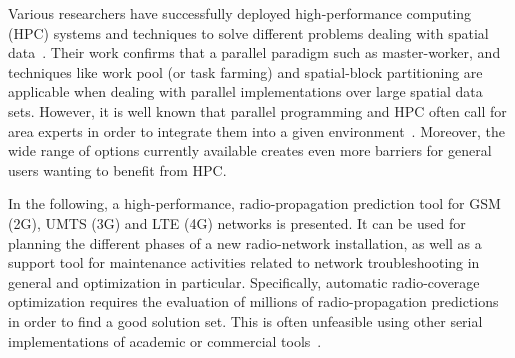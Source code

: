 Various researchers have successfully deployed high-performance computing
(HPC) systems and
techniques to solve different problems dealing with spatial data~\cite{Akhter_Porting_GRASS_raster_module_to_distributed_computing:2007,Armstrong_Using_a_computational_grid_for_geographic_information_analysis:2005,Guan_A_parallel_computing_approach_to_fast_geostatistical_areal_interpolation:2011,Huang_Using_adaptively_coupled_models_and_high_performance_computing_for_enabling_the_computability_of_dust_storm_forecasting:2012,Li_Parallel_cellular_automata_for_large_scale_urban_simulation_using_load_balancing_techniques:2010,Yin_A_framework_for_integrating_GIS_and_parallel_computing_for_spatial_control_problems_a_case_study_of_wildfire_dontrol:2012,Osterman_CUDA_on_GRASS:2012,Tabik-High_performance_three_horizon_composition_algorithm_for_large_scale_terrains:2011,Tabik-Optimal_tilt_and_orientation_maps_a_multi_algorithm_approach_for_heterogeneous_multicore_GPU_systems:2013,Tabik_Simultaneous_computation_of_total_viewshed_on_large_high_resolution_grids:2012,Widener_Developing_a_parallel_computational_implementation_of_AMOEBA:2012}.
Their work confirms that a parallel paradigm such as master-worker,
and techniques like work pool (or task farming) and spatial-block
partitioning are applicable when dealing with parallel implementations
over large spatial data sets. However, it is well known that parallel
programming and HPC often call for area experts in order to integrate
them into a given environment~\cite{Clematis_High_performance_computing_with_geographical_data:2003}.
Moreover, the wide range of options currently available creates even
more barriers for general users wanting to benefit from HPC.

\bigskip{}


In the following, a high-performance, radio-propagation prediction
tool for GSM (2G), UMTS (3G) and LTE (4G) networks is presented. It
can be used for planning the different phases of a new radio-network
installation, as well as a support tool for maintenance activities
related to network troubleshooting in general and optimization in
particular. Specifically, automatic radio-coverage optimization requires
the evaluation of millions of radio-propagation predictions in order
to find a good solution set. This is often unfeasible using other
serial implementations of academic or commercial tools~\cite{Ozimek_Open.source.radio.coverage.prediction:2010,Mehlfuhrer_The_Vienna_LTE_Simulators_enabling_reproducibility_in_wireless_communications_research:2011,Piro_Simulating_LTE_cellular_systems_an_open_source_framework:2011}.

